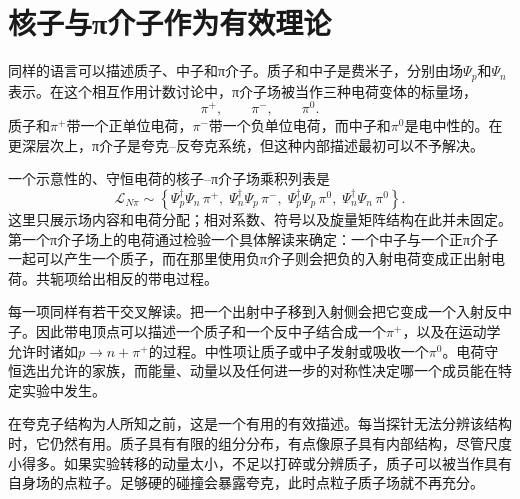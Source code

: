 \begin{classroomqa}
\end{classroomqa}

\section{核子与{\proseunicodefont π}介子作为有效理论}

同样的语言可以描述质子、中子和{\proseunicodefont π}介子。质子和中子是费米子，分别由场\(\Psi_p\)和\(\Psi_n\)表示。在这个相互作用计数讨论中，{\proseunicodefont π}介子场被当作三种电荷变体的标量场，
\begin{equation}
\pi^+,
\qquad
\pi^-,
\qquad
\pi^0.
\end{equation}
质子和\(\pi^+\)带一个正单位电荷，\(\pi^-\)带一个负单位电荷，而中子和\(\pi^0\)是电中性的。在更深层次上，{\proseunicodefont π}介子是夸克--反夸克系统，但这种内部描述最初可以不予解决。

一个示意性的、守恒电荷的核子--{\proseunicodefont π}介子场乘积列表是
\begin{equation}
\mathcal L_{N\pi}
\sim
\left\{
\Psi_p^\dagger\Psi_n\,\pi^+,\;
\Psi_n^\dagger\Psi_p\,\pi^-,\;
\Psi_p^\dagger\Psi_p\,\pi^0,\;
\Psi_n^\dagger\Psi_n\,\pi^0
\right\}.
\end{equation}
这里只展示场内容和电荷分配；相对系数、符号以及旋量矩阵结构在此并未固定。第一个{\proseunicodefont π}介子场上的电荷通过检验一个具体解读来确定：一个中子与一个正{\proseunicodefont π}介子一起可以产生一个质子，而在那里使用负{\proseunicodefont π}介子则会把负的入射电荷变成正出射电荷。共轭项给出相反的带电过程。

每一项同样有若干交叉解读。把一个出射中子移到入射侧会把它变成一个入射反中子。因此带电顶点可以描述一个质子和一个反中子结合成一个\(\pi^+\)，以及在运动学允许时诸如\(p\to n+\pi^+\)的过程。中性项让质子或中子发射或吸收一个\(\pi^0\)。电荷守恒选出允许的家族，而能量、动量以及任何进一步的对称性决定哪一个成员能在特定实验中发生。

在夸克子结构为人所知之前，这是一个有用的有效描述。每当探针无法分辨该结构时，它仍然有用。质子具有有限的组分分布，有点像原子具有内部结构，尽管尺度小得多。如果实验转移的动量太小，不足以打碎或分辨质子，质子可以被当作具有自身场的点粒子。足够硬的碰撞会暴露夸克，此时点粒子质子场就不再充分。

